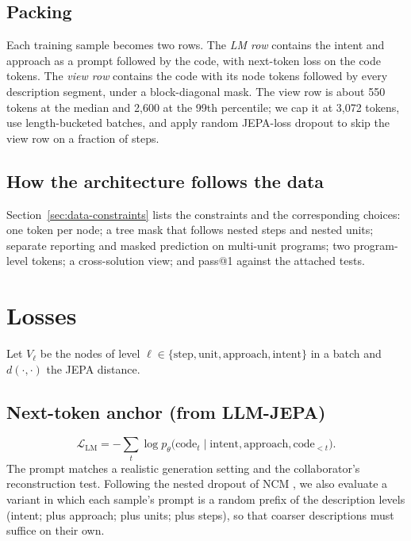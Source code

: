 \documentclass[11pt]{article}
\newcommand{\Lcal}{\mathcal{L}}
\begin{document}
\subsection{Packing}
\label{sec:packing}
Each training sample becomes two rows. The \emph{LM row} contains the intent and approach as a prompt followed by the
code, with next-token loss on the code tokens. The \emph{view row} contains the code with its node tokens followed by
every description segment, under a block-diagonal mask. The view row is about 550 tokens at the median and 2,600 at
the 99th percentile; we cap it at 3,072 tokens, use length-bucketed batches, and apply random JEPA-loss dropout to
skip the view row on a fraction of steps.

\subsection{How the architecture follows the data}
Section~\ref{sec:data-constraints} lists the constraints and the corresponding choices: one token per node; a tree
mask that follows nested steps and nested units; separate reporting and masked prediction on multi-unit programs;
two program-level tokens; a cross-solution view; and pass@1 against the attached tests.

\section{Losses}
\label{sec:losses}

Let $V_\ell$ be the nodes of level $\ell\in\{\text{step},\text{unit},\text{approach},\text{intent}\}$ in a batch and
$d(\cdot,\cdot)$ the JEPA distance.

\subsection{Next-token anchor (from LLM-JEPA)}
\label{sec:loss-anchor}
\begin{equation}
\Lcal_{\text{LM}} = -\sum_t \log p_\theta\bigl(\text{code}_t \mid \text{intent}, \text{approach}, \text{code}_{<t}\bigr).
\end{equation}
The prompt matches a realistic generation setting and the collaborator's reconstruction test. Following the nested
dropout of NCM \citep{kumbong2026ncm}, we also evaluate a variant in which each sample's prompt is a random prefix of
the description levels (intent; plus approach; plus units; plus steps), so that coarser descriptions must suffice on
their own.
\end{document}
